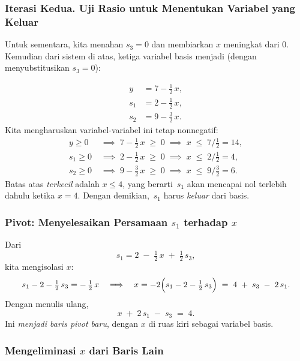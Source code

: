 \subsubsection*{Iterasi Kedua. Uji Rasio untuk Menentukan Variabel yang Keluar}

\begin{tcolorbox}[colback=algleave!6, colframe=algleave, coltitle=white, fonttitle=\bfseries, sharp corners, title={\ding{47}\ Iterasi Kedua: Uji Rasio}]

Untuk sementara, kita menahan \(s_3=0\) dan membiarkan \(x\) meningkat dari \(0\).  
Kemudian dari sistem di atas, ketiga variabel basis menjadi (dengan menyubstitusikan \(s_3=0\)):

\[
\begin{aligned}
y   &= 7 - \tfrac12\,x,\\
s_1 &= 2 - \tfrac12\,x,\\
s_2 &= 9 - \tfrac32\,x.
\end{aligned}
\]
Kita mengharuskan variabel-variabel ini tetap nonnegatif:
\[
\begin{aligned}
y \ge 0 \;&\implies\; 7 - \tfrac12\,x \;\ge\; 0 \;\implies\; x \;\le\; 7/\tfrac{1}{2} = 14,\\
s_1 \ge 0 \;&\implies\; 2 - \tfrac12\,x \;\ge\; 0 \;\implies\; x \;\le\; 2/\tfrac{1}{2} = 4,\\
s_2 \ge 0 \;&\implies\; 9 - \tfrac32\,x \;\ge\; 0 \;\implies\; x \;\le\; 9/\tfrac{3}{2} = 6.
\end{aligned}
\]
Batas atas \emph{terkecil} adalah \(x \le 4\), yang berarti \(\,s_1\) akan mencapai nol terlebih dahulu ketika \(x=4\).  
Dengan demikian, \(\,s_1\) harus \emph{keluar} dari basis.
\end{tcolorbox}
\subsubsection*{Pivot: Menyelesaikan Persamaan \(s_1\) terhadap \(x\)}

Dari
\[
s_1 = 2 \;-\;\tfrac12\,x \;+\;\tfrac12\,s_3,
\]
kita mengisolasi \(x\):
\[
s_1 - 2 - \tfrac12\,s_3 = -\,\tfrac12\,x
\quad\Longrightarrow\quad
x = -2\Bigl(s_1 - 2 - \tfrac12\,s_3\Bigr)
\;=\;
4 \;+\; s_3 \;-\; 2\,s_1.
\]
Dengan menulis ulang,
\[
x \;+\; 2\,s_1 \;-\; s_3 
\;=\;
4.
\]
Ini \emph{menjadi baris pivot baru}, dengan \(x\) di ruas kiri sebagai variabel basis.

\subsubsection*{Mengeliminasi \(x\) dari Baris Lain}

